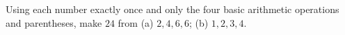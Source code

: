 Using each number exactly once and only the four basic arithmetic operations and parentheses, make $24$ from (a) $2,4,6,6$; (b) $1,2,3,4$.
